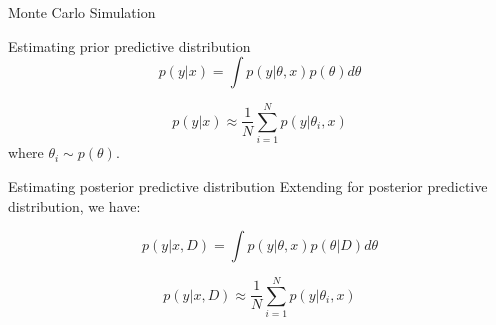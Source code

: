 \documentclass{beamer}
\begin{document}
\begin{section}{Monte Carlo Simulation}
\begin{frame}{Estimating prior predictive distribution}
            \begin{equation}
                p(y|x) = \int p(y|\theta, x) p(\theta) d\theta 
            \end{equation}

            \begin{equation}
                p(y|x) \approx \frac{1}{N} \sum_{i=1}^{N} p(y|\theta_i, x)
            \end{equation}
            where $\theta_i \sim p(\theta)$.
    \end{frame}

    \begin{frame}{Estimating posterior predictive distribution}
        Extending for posterior predictive distribution, we have:

        \begin{equation}
            p(y|x, D) = \int p(y|\theta, x) p(\theta|D) d\theta 
        \end{equation}

        \begin{equation}
            p(y|x, D) \approx \frac{1}{N} \sum_{i=1}^{N} p(y|\theta_i, x)
        \end{equation}
        
    \end{frame}

\end{section}
\end{document}
